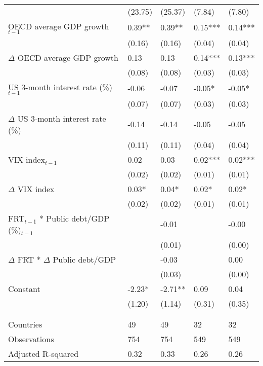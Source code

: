 \begin{tabular}{lp{3cm}p{3cm}p{3cm}p{3cm}}
   & (23.75) & (25.37) & (7.84) & (7.80) \\ 
  OECD average GDP growth$_{t-1}$ & 0.39** & 0.39** & 0.15*** & 0.14*** \\ 
   & (0.16) & (0.16) & (0.04) & (0.04) \\ 
  $\Delta$ OECD average GDP growth & 0.13 & 0.13 & 0.14*** & 0.13*** \\ 
   & (0.08) & (0.08) & (0.03) & (0.03) \\ 
  US 3-month interest rate (\%)$_{t-1}$ & -0.06 & -0.07 & -0.05* & -0.05* \\ 
   & (0.07) & (0.07) & (0.03) & (0.03) \\ 
  $\Delta$ US 3-month interest rate (\%) & -0.14 & -0.14 & -0.05 & -0.05 \\ 
   & (0.11) & (0.11) & (0.04) & (0.04) \\ 
  VIX index$_{t-1}$ & 0.02 & 0.03 & 0.02*** & 0.02*** \\ 
   & (0.02) & (0.02) & (0.01) & (0.01) \\ 
  $\Delta$ VIX index & 0.03* & 0.04* & 0.02* & 0.02* \\ 
   & (0.02) & (0.02) & (0.01) & (0.01) \\ 
  FRT$_{t-1}$ * Public debt/GDP (\%)$_{t-1}$ &  & -0.01 &  & -0.00 \\ 
   &  & (0.01) &  & (0.00) \\ 
  $\Delta$ FRT * $\Delta$ Public debt/GDP &  & -0.03 &  & 0.00 \\ 
   &  & (0.03) &  & (0.00) \\ 
  Constant & -2.23* & -2.71** & 0.09 & 0.04 \\ 
   & (1.20) & (1.14) & (0.31) & (0.35) \\ 
   &  &  &  &  \\ 
   &  &  &  &  \\ 
  Countries & 49 & 49 & 32 & 32 \\ 
  Observations & 754 & 754 & 549 & 549 \\ 
  Adjusted R-squared & 0.32 & 0.33 & 0.26 & 0.26 \\ 
   \hline
\end{tabular}
\endgroup
